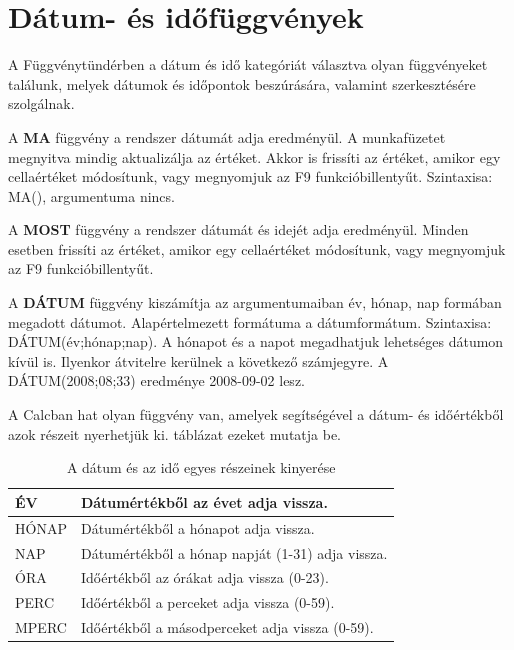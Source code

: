 \chapter{Dátum- és időfüggvények}
\thispagestyle{empty}

A Függvénytündérben a dátum és idő kategóriát
választva olyan függvényeket találunk, melyek dátumok és
időpontok beszúrására, valamint szerkesztésére
szolgálnak. 

A \textbf{MA} függvény a rendszer dátumát adja
eredményül. A munkafüzetet megnyitva mindig aktualizálja az
értéket. Akkor is frissíti az értéket, amikor egy
cellaértéket módosítunk, vagy megnyomjuk az F9
funkcióbillentyűt. Szintaxisa: MA(), argumentuma nincs.

A \textbf{MOST} függvény a rendszer dátumát és idejét adja
eredményül. Minden esetben frissíti az értéket, amikor egy
cellaértéket módosítunk, vagy megnyomjuk az F9
funkcióbillentyűt.

A \textbf{DÁTUM} függvény kiszámítja az argumentumaiban év,
hónap, nap formában megadott dátumot. Alapértelmezett
formátuma a dátumformátum. Szintaxisa: DÁTUM(év;hónap;nap). A
hónapot és a  napot megadhatjuk lehetséges dátumon kívül
is. Ilyenkor átvitelre kerülnek a következő számjegyre. A
DÁTUM(2008;08;33) eredménye 2008-09-02 lesz.

A Calcban hat olyan függvény van, amelyek segítségével a
dátum- és időértékből azok részeit nyerhetjük ki. 
 táblázat ezeket mutatja be.

\begin{table}[!h]
\begin{center}
\caption{A dátum és az idő egyes részeinek kinyerése}\label{DateFüggvények}
\begin{tabular}{|m{2.5cm}|m{8cm}|}
\hline
ÉV &
Dátumértékből az évet adja vissza.\\ \hline
HÓNAP &
Dátumértékből a hónapot adja vissza.\\ \hline
NAP &
Dátumértékből a hónap napját (1-31) adja vissza.\\ \hline
ÓRA &
Időértékből az órákat adja vissza (0-23).\\ \hline
PERC &
Időértékből a perceket adja vissza (0-59).\\ \hline
MPERC &
Időértékből a másodperceket adja vissza (0-59).\\ \hline
\end{tabular}
\end{center}
\end{table}

